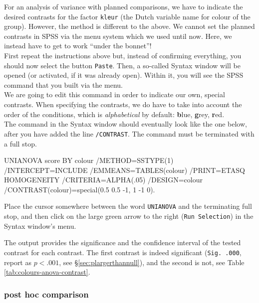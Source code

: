 \documentclass[
]{book}
\newenvironment{Shaded}{\begin{snugshade}}{\end{snugshade}}
\newcommand{\NormalTok}[1]{#1}
\begin{document}
For an analysis of variance with planned comparisons, we have to
indicate the desired contrasts for the factor \texttt{kleur}
(the Dutch variable name for colour of the group).
However, the method
is different to the above. We cannot set the planned contrasts in SPSS
via the menu system which we used until now. Here, we instead have
to get to work ``under the bonnet''!\\
First repeat the instructions above but, instead of confirming everything,
you should now select the button \texttt{Paste}. Then, a so-called Syntax window
will be opened (or activated, if it was already open). Within it, you
will see the SPSS command that you built via the menu.\\
We are going to edit this command in order to indicate our own, special
contrasts. When specifying the contrasts, we do have to take into
account the order of the conditions, which is \emph{alphabetical} by default: \textbf{b}lue, \textbf{g}rey,
\textbf{r}ed.\\
The command in the Syntax window should eventually look like the one
below, after you have added the line \texttt{/CONTRAST}. The command
must be terminated with a full stop.\\

\begin{Shaded}
\begin{Highlighting}[]
\NormalTok{UNIANOVA score BY colour}
\NormalTok{  /METHOD=SSTYPE(1)}
\NormalTok{  /INTERCEPT=INCLUDE}
\NormalTok{  /EMMEANS=TABLES(colour) }
\NormalTok{  /PRINT=ETASQ HOMOGENEITY}
\NormalTok{  /CRITERIA=ALPHA(.05)}
\NormalTok{  /DESIGN=colour}
\NormalTok{  /CONTRAST(colour)=special(0.5 0.5 {-}1, 1 {-}1 0).}
\end{Highlighting}
\end{Shaded}

Place the cursor somewhere between the word \texttt{UNIANOVA} and the terminating
full stop, and then click on the large green arrow to the right (\texttt{Run\ Selection})
in the Syntax window's menu.

The output provides the significance and the confidence interval
of the tested contrast for each contrast. The first contrast
is indeed significant (\texttt{Sig.\ .000}, report as \(p<.001\), see
§\ref{sec:plargerthannull}), and the second is not, see
Table \ref{tab:colours-anova-contrast}.

\hypertarget{post-hoc-comparison}{%
\subsubsection{post hoc comparison}\label{post-hoc-comparison}}
\end{document}
